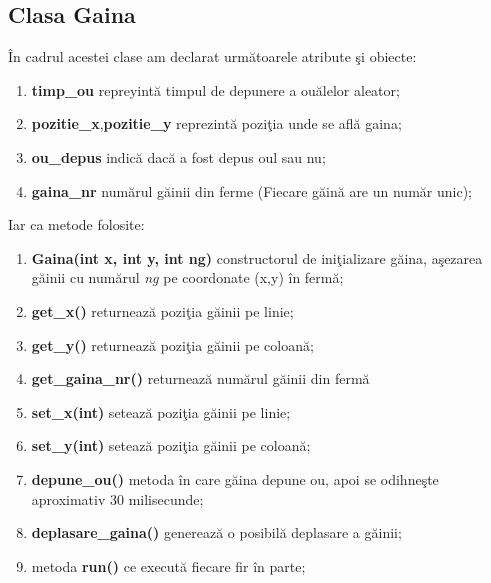 \documentclass[12pt,a4paper]{article}
\begin{document}
\subsection{Clasa Gaina}
	\^{I}n cadrul acestei clase am declarat urm\u{a}toarele atribute \c{s}i obiecte:
	\begin{enumerate}
		\item \textbf{timp\_ou} repreyint\u{a} timpul de depunere a ou\u{a}lelor aleator;
  		\item \textbf{pozitie\_x},\textbf{pozitie\_y} reprezint\u{a} pozi\c{t}ia unde se afl\u{a} gaina;
  		\item \textbf{ou\_depus} indic\u{a} dac\u{a} a fost depus oul sau nu;
  		\item \textbf{gaina\_nr} num\u{a}rul g\u{a}inii din ferme (Fiecare g\u{a}in\u{a} are un num\u{a}r unic);
	\end{enumerate}
	Iar ca metode folosite:
	\begin{enumerate}
		\item \textbf{Gaina(int x, int y, int ng)} constructorul de ini\c{t}ializare g\u{a}ina, a\c{s}ezarea g\u{a}inii cu num\u{a}rul \textit{ng} pe coordonate (x,y) \^{i}n ferm\u{a};
		\item \textbf{get\_x()} returneaz\u{a} pozi\c{t}ia g\u{a}inii pe linie;
		\item \textbf{get\_y()} returneaz\u{a} pozi\c{t}ia g\u{a}inii pe coloan\u{a};
		\item \textbf{get\_gaina\_nr()} returneaz\u{a} num\u{a}rul g\u{a}inii din ferm\u{a}
		\item \textbf{set\_x(int)} seteaz\u{a} pozi\c{t}ia g\u{a}inii pe linie;
		\item \textbf{set\_y(int)} seteaz\u{a} pozi\c{t}ia g\u{a}inii pe coloan\u{a};
		\item \textbf{depune\_ou()} metoda \^{i}n care g\u{a}ina depune ou, apoi se odihne\c{s}te aproximativ 30 milisecunde;
		\item \textbf{deplasare\_gaina()}  genereaz\u{a} o posibil\u{a} deplasare a g\u{a}inii;
		\item metoda \textbf{run()} ce execut\u{a} fiecare fir \^{i}n parte;
	\end{enumerate}
	
\end{document}
